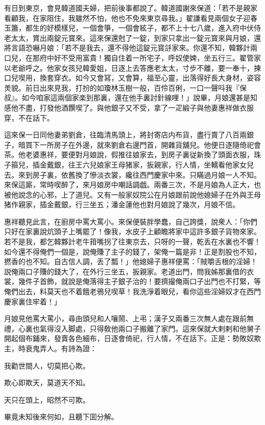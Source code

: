 有日到東京，會見韓道國夫婦，把前後事都說了。韓道國謝來保道：「若不是親家看顧我，在家阻住，我雖然不怕，他也不免來東京尋我。」翟謙看見兩個女子迎春玉簫，都生的好模樣兒，一個會箏，一個會絃子，都不上十七八歲，進入府中伏侍老太太，賞出兩錠元寳來。這來保還尅了一錠，到家只拿出一錠元寳來與月娘，還將言語恐嚇月娘：「若不是我去，還不得他這錠元寳㧱家來。你還不知，韓夥計兩口兒，在那府中好不受用富貴！獨自住着一所宅子，呼奴使婢，坐五行三。翟管家以老爺呼之。他家女孩兒韓愛姐，日逐上去答應老太太，寸步不離，要一奉十，揀口兒喫用，換套穿衣。如今又會冩，又會算，福至心靈，出落得好長大身材，姿容羙貌。前日出來見我，打扮的如瓊林玉樹一般，百伶百俐，一口一聲呌我『保叔』。如今咱家這兩個家楽到那裏，還在他手裏討針線哩！」說畢，月娘還甚是知感他不盡，打發他酒饌喫了。與他銀子又不受，拿了一疋緞子與他妻惠祥做衣服穿，不在話下。

這來保一日同他妻弟劉倉，往臨清馬頭上，將封寄店内布貨，盡行賣了八百兩銀子，暗買下一所房子在外邊，就來劉倉右邊門首，開雜貨舖兒。他便日逐隨倚祀會茶。他老婆惠祥，要便對月娘說，假推往娘家去，到房子裏従新換了頭面衣服，珠子箍兒，插金戴銀，往王六兒娘家王母猪家，扳親家，行人情，坐轎看他家女兒去。來到房子裏，依舊換了慘淡衣裳，纔往西門慶家中來。只瞞過月娘一人不知。來保這廝，常時喫醉了，來月娘房中嘲話調戯。兩番三次，不是月娘為人正大，也被他說念的心邪，上了道兒。又有一般家奴院公在月娘跟前說他媳婦子在外與王母猪作親家，插金戴銀，行三坐五；潘金蓮他也對月娘說了幾次，月娘不信。

惠祥聽見此言，在廚房中罵大罵小。來保便裝胖學蠢，自己誇獎，說衆人：「你們只好在家裏說炕頭子上嘴罷了！像我，水皮子上顧瞻將家中這許多銀子貨物來家。若不是我，都乞韓夥計老牛箝嘴拐了往東京去，只呀的一聲，乾丢在水裏也不響！如今還不得俺們一個是，說俺賺了主子的錢了，架俺一篇是非！正是割股也不知，撚香的也不知。自古信人調，丢了瓢！」他媳婦子惠祥便罵：「賊嚼舌根的淫婦！説俺兩口子賺的錢大了，在外行三坐五，扳親家。老道出門，問我姊那裏借的衣裳，幾件子首飾，就說是俺落得主子銀子治的！要擠撮俺兩口子出門也不打緊，等俺們出去，料莫天也不着餓老鴉兒喫草！我洗淨着眼兒，看你這些淫婦奴才在西門慶家裏住牢着！」

月娘見他罵大罵小，尋由頭兒和人嚷鬧、上弔；漢子又兩番三次無人處在跟前無禮，心裏也氣得沒入脚處，只得敎他兩口子搬離了家門。這來保就大剌剌和他舅子開起個布鋪來，發賣各色細布，日逐會倚祀，行人情，不在話下。正是：勢敗奴欺主，時衰鬼弄人。有詩為證：

我勸世間人，切莫把心欺。

欺心即欺天，莫道天不知。

天只在頭上，昭然不可欺。

畢竟未知後來何如，且聽下囬分解。

